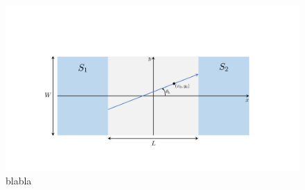\begin{figure}[hhh]
\centering
\includegraphics[width=17cm,trim = 4cm 2cm 5cm 5cm, clip=true ]{fig/Explaination}
\caption{blabla}
\label{fig:Explaination}
\end{figure}